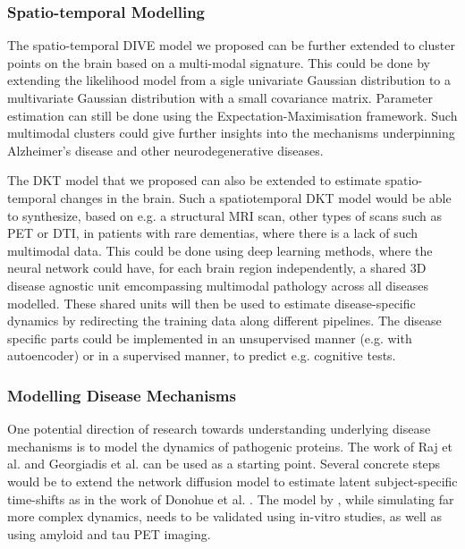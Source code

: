 \subsubsection{Spatio-temporal Modelling}
\label{sec:conMetSpa}

The spatio-temporal DIVE model we proposed can be further extended to cluster points on the brain based on a multi-modal signature. This could be done by extending the likelihood model from a sigle univariate Gaussian distribution to a multivariate Gaussian distribution with a small covariance matrix.  Parameter estimation can still be done using the Expectation-Maximisation framework. Such multimodal clusters could give further insights into the mechanisms underpinning Alzheimer's disease and other neurodegenerative diseases.

The DKT model that we proposed can also be extended to estimate spatio-temporal changes in the brain. Such a spatiotemporal DKT model would be able to synthesize, based on e.g. a structural MRI scan, other types of scans such as PET or DTI, in patients with rare dementias, where there is a lack of such multimodal data. This could be done using deep learning methods, where the neural network could have, for each brain region independently, a shared 3D disease agnostic unit emcompassing multimodal pathology across all diseases modelled. These shared units will then be used to estimate disease-specific dynamics by redirecting the training data along different pipelines. The disease specific parts could be implemented in an unsupervised manner (e.g. with autoencoder) or in a supervised manner, to predict e.g. cognitive tests. 

\subsubsection{Modelling Disease Mechanisms}
\label{sec:conMetMec}

One potential direction of research towards understanding underlying disease mechanisms is to model the dynamics of pathogenic proteins. The work of Raj et al. \cite{raj2012network, raj2015network} and Georgiadis et al. \cite{georgiadis2018computational} can be used as a starting point. Several concrete steps would be to extend the network diffusion model \cite{raj2015network} to estimate latent subject-specific time-shifts as in the work of Donohue et al. \cite{donohue2014estimating}. The model by \cite{georgiadis2018computational}, while simulating far more complex dynamics, needs to be validated using in-vitro studies, as well as using amyloid and tau PET imaging. 

